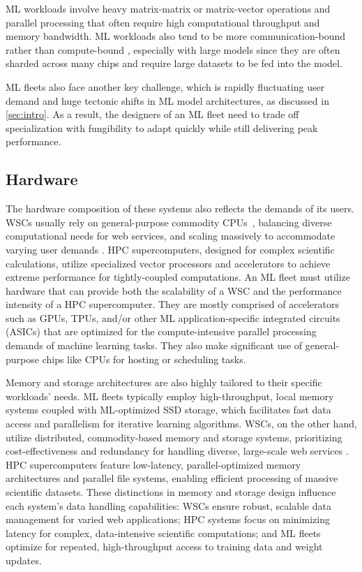 ML workloads involve heavy matrix-matrix \cite{fatahalian2004understanding} or matrix-vector \cite{bell2008efficient} operations and parallel processing that often require high computational throughput and memory bandwidth. ML workloads also tend to be more communication-bound rather than compute-bound \cite{li2014communication}, especially with large models since they are often sharded across many chips and require large datasets to be fed into the model.

ML fleets also face another key challenge, which is rapidly fluctuating user demand and huge tectonic shifts in ML model architectures, as discussed in \autoref{sec:intro}. As a result, the designers of an ML fleet need to trade off specialization with fungibility to adapt quickly while still delivering peak performance. 
\subsection{Hardware}
The hardware composition of these systems also reflects the demands of its users. WSCs usually rely on general-purpose commodity CPUs~\cite{barroso2009wsc}, balancing diverse computational needs for web services, and scaling massively to accommodate varying user demands \cite{ranganathan2024twentyfive}. HPC supercomputers, designed for complex scientific calculations, utilize specialized vector processors \cite{odajima2020fujitsu} and accelerators to achieve extreme performance for tightly-coupled computations. An ML fleet must utilize hardware that can provide both the scalability of a WSC and the performance intensity of a HPC supercomputer. They are mostly comprised of accelerators such as GPUs, TPUs, and/or other ML application-specific integrated circuits (ASICs) that are optimized for the compute-intensive parallel processing demands of machine learning tasks. They also make significant use of general-purpose chips like CPUs for hosting or scheduling tasks.

Memory and storage architectures are also highly tailored to their specific workloads' needs. ML fleets typically employ high-throughput, local memory systems coupled with ML-optimized SSD storage, which facilitates fast data access and parallelism for iterative learning algorithms\cite{kumar2021exploring}.  WSCs, on the other hand, utilize distributed, commodity-based memory and storage systems, prioritizing cost-effectiveness and redundancy for handling diverse, large-scale web services \cite{barroso2009wsc}. HPC supercomputers feature low-latency, parallel-optimized memory architectures and parallel file systems, enabling efficient processing of massive scientific datasets. These distinctions in memory and storage design influence each system's data handling capabilities: WSCs ensure robust, scalable data management for varied web applications; HPC systems focus on minimizing latency for complex, data-intensive scientific computations; and ML fleets optimize for repeated, high-throughput access to training data and weight updates.  
